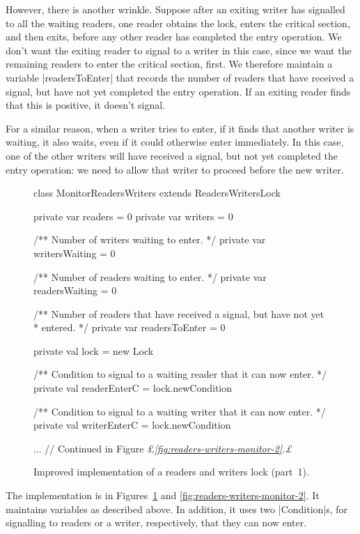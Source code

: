 However, there is another wrinkle.  Suppose after an exiting writer has
signalled to all the waiting readers, one reader obtains the lock, enters the
critical section, and then exits, before any other reader has completed the
entry operation.  We don't want the exiting reader to signal to a writer in
this case, since we want the remaining readers to enter the critical section,
first.  We therefore maintain a variable |readersToEnter| that records the
number of readers that have received a signal, but have not yet completed the
entry operation.  If an exiting reader finds that this is positive, it doesn't
signal.

For a similar reason, when a writer tries to enter, if it finds that another
writer is waiting, it also waits, even if it could otherwise enter
immediately.  In this case, one of the other writers will have received a
signal, but not yet completed the entry operation: we need to allow that
writer to proceed before the new writer.


\begin{figure}
\begin{scala}
class MonitorReadersWriters extends ReadersWritersLock{
  private var readers = 0
  private var writers = 0

  /** Number of writers waiting to enter. */
  private var writersWaiting = 0

  /** Number of readers waiting to enter. */
  private var readersWaiting = 0

  /** Number of readers that have received a signal, but have not yet
    * entered. */
  private var readersToEnter = 0

  private val lock = new Lock

  /** Condition to signal to a waiting reader that it can now enter. */
  private val readerEnterC = lock.newCondition

  /** Condition to signal to a waiting writer that it can now enter. */
  private val writerEnterC = lock.newCondition

  ... // Continued in Figure £\sl\ref{fig:readers-writers-monitor-2}.£
}
\end{scala}
\caption{Improved implementation of a readers and writers lock (part~1).}
\label{fig:readers-writers-monitor-1}
\end{figure}


The implementation is in Figures~\ref{fig:readers-writers-monitor-1} and
\ref{fig:readers-writers-monitor-2}.  It maintains variables as described
above.  In addition, it uses two |Condition|s, for signalling to readers or a
writer, respectively, that they can now enter.

